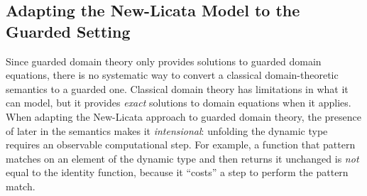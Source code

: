 %



\subsection{Adapting the New-Licata Model to the Guarded Setting}


Since guarded domain theory only provides solutions to guarded domain equations,
there is no systematic way to convert a classical domain-theoretic semantics to
a guarded one.  Classical domain theory has limitations in what it can model,
but it provides \emph{exact} solutions to domain equations when it applies. When
adapting the New-Licata approach to guarded domain theory, the presence of later
in the semantics makes it \emph{intensional}: unfolding the dynamic type
requires an observable computational step. For example, a function that pattern
matches on an element of the dynamic type and then returns it unchanged is
\emph{not} equal to the identity function, because it ``costs'' a step to
perform the pattern match.


